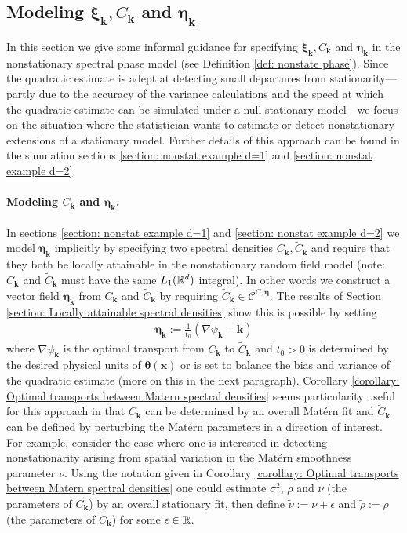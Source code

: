 \documentclass[10pt,noinfoline]{imsart}
\newcommand{\bs}{\boldsymbol}
\begin{document}
\subsection{Modeling $\bs \xi_{\bs k}, C_{\bs k}$ and $\bs\eta_{\bs k}$}
\label{section: modeling xi, C and eta}

In this section we give some informal guidance for specifying $\bs \xi_{\bs k}, C_{\bs k}$ and $\bs\eta_{\bs k}$ in the nonstationary spectral phase model (see Definition \ref{def: nonstate phase}). Since the quadratic estimate is  adept at detecting small departures from stationarity---partly due to the accuracy of the variance calculations and the speed at which the quadratic estimate can be simulated under a null stationary model---we focus on the situation where the statistician wants to estimate or detect nonstationary extensions of a stationary model. Further details of this approach can be found in the simulation sections \ref{section: nonstat example d=1} and \ref{section: nonstat example d=2}. 


\paragraph{Modeling $C_{\bs k}$ and $\bs\eta_{\bs k}$.} In sections \ref{section: nonstat example d=1} and \ref{section: nonstat example d=2}  we model $\bs\eta_{\bs k}$ implicitly by specifying two spectral densities $C_{\bs k}, \tilde C_{\bs k}$ and require that they both be locally attainable in the nonstationary random field model (note: $C_{\bs k}$ and $\tilde C_{\bs k}$ must have the same $L_1(\Bbb R^d)$ integral). In other words we construct a vector field $\bs \eta_{\bs k}$ from $C_{\bs k}$ and $\tilde C_{\bs k}$ by requiring  $\tilde C_{\bs k}\in \mathscr C^{C,\bs \eta}$. The results of Section \ref{section: Locally attainable spectral densities} show this is possible by setting 
\begin{align}
\label{eq: modeling eta}
\bs \eta_{\bs k}:=  \frac{1}{t_0}(\nabla \psi_{\bs k}-\bs k)
\end{align}
 where  $\nabla \psi_{\bs k}$ is the optimal transport from $C_{\bs k}$ to $\tilde C_{\bs k}$ and $t_0>0$ is determined  by the  desired physical units of $\bs \theta(\bs x)$ or is set to balance the bias and variance of the quadratic estimate (more on this in the next paragraph). Corollary \ref{corollary: Optimal transports between Matern spectral densities} seems particularity useful for this approach in that $C_{\bs k}$ can be determined by an overall Mat\'ern fit and $\tilde C_{\bs k}$ can be defined by perturbing the Mat\'ern  parameters in a direction of interest. For example, consider the case where one is interested in detecting nonstationarity arising from spatial variation in the Mat\'ern smoothness parameter $\nu$.  Using the notation given in Corollary \ref{corollary: Optimal transports between Matern spectral densities} one could estimate $\sigma^2$, $\rho$ and  $\nu$ (the parameters of $C_{\bs k}$) by an overall stationary fit, then define  $\tilde\nu := \nu + \epsilon$ and $\tilde \rho := \rho$ (the parameters of $\tilde C_{\bs k}$) for some $\epsilon\in\Bbb R$.  
\end{document}
